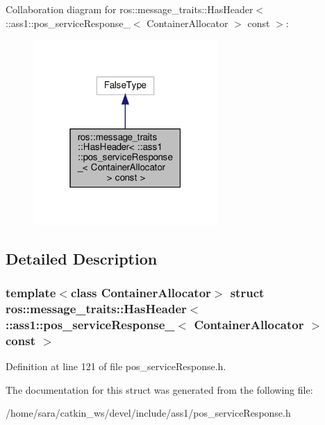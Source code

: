 Collaboration diagram for ros\+:\+:message\+\_\+traits\+:\+:Has\+Header$<$ \+:\+:ass1\+:\+:pos\+\_\+service\+Response\+\_\+$<$ Container\+Allocator $>$ const $>$\+:
\nopagebreak
\begin{figure}[H]
\begin{center}
\leavevmode
\includegraphics[width=199pt]{structros_1_1message__traits_1_1HasHeader_3_01_1_1ass1_1_1pos__serviceResponse___3_01ContainerAl81efbd79dc156495b952ad190d097f13}
\end{center}
\end{figure}


\subsection{Detailed Description}
\subsubsection*{template$<$class Container\+Allocator$>$\newline
struct ros\+::message\+\_\+traits\+::\+Has\+Header$<$ \+::ass1\+::pos\+\_\+service\+Response\+\_\+$<$ Container\+Allocator $>$ const $>$}



Definition at line 121 of file pos\+\_\+service\+Response.\+h.



The documentation for this struct was generated from the following file\+:\begin{DoxyCompactItemize}
\item 
/home/sara/catkin\+\_\+ws/devel/include/ass1/pos\+\_\+service\+Response.\+h\end{DoxyCompactItemize}
